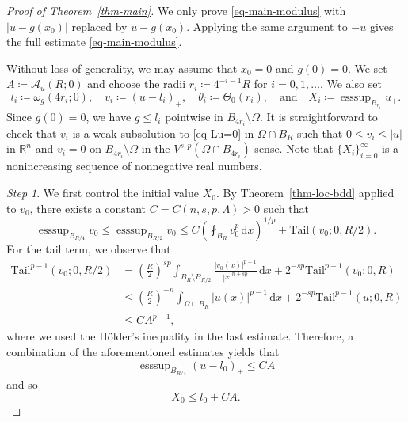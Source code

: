\documentclass[11pt]{amsart}
\theoremstyle{plain}
\theoremstyle{definition}
\numberwithin{equation}{section}
\DeclareMathOperator*{\esssup}{esssup}
\begin{document}
\begin{proof}[Proof of Theorem~\ref{thm-main}]
We only prove \eqref{eq-main-modulus} with $|u-g(x_0)|$ replaced by $u-g(x_0)$. Applying the same argument to $-u$ gives the full estimate \eqref{eq-main-modulus}.

Without loss of generality, we may assume that $x_0=0$ and $g(0)=0$. We set $A \coloneqq \mathcal A_u(R; 0)$ and choose the radii $r_i \coloneqq 4^{-i-1}R$ for $i=0, 1, \dots$. We also set
\begin{equation*}
        l_i\coloneqq \omega_g(4r_i; 0), \quad
        v_i\coloneqq (u-l_i)_+, \quad
        \theta_i\coloneqq \Theta_0(r_i), \quad \text{and} \quad
       X_i\coloneqq \esssup_{B_{r_i}}u_+. 
\end{equation*}
Since $g(0)=0$, we have $g \leq l_i$ pointwise in $B_{4r_i} \setminus \Omega$. It is straightforward to check that $v_i$ is a weak subsolution to \eqref{eq-Lu=0} in $\Omega \cap B_R$ such that $0 \leq v_i \leq |u|$ in $\mathbb{R}^n$ and $v_i=0$ on $B_{4r_i} \setminus \Omega$ in the $V^{s, p}(\Omega \cap B_{4r_i})$-sense. Note that $\{X_i\}_{i=0}^{\infty}$ is a nonincreasing sequence of nonnegative real numbers.

\emph{Step 1}. We first control the initial value $X_0$. By Theorem~\ref{thm-loc-bdd} applied to $v_0$, there exists a constant $C=C(n, s, p, \Lambda)>0$ such that
    \begin{equation*}
        \esssup_{B_{R/4}}v_0 \leq \esssup_{B_{R/2}}v_0 \leq C \left(\fint_{B_R}v_0^p \,\mathrm{d}x \right)^{1/p} + \mathrm{Tail}(v_0; 0, R/2).
    \end{equation*}
    For the tail term, we observe that
    \begin{align*}
            \mathrm{Tail}^{p-1}(v_0; 0, R/2)
            &=\left(\frac{R}{2}\right)^{sp} \int_{B_R \setminus B_{R/2}} \frac{|v_0(x)|^{p-1}}{|x|^{n+sp}}\,\mathrm{d}x + 2^{-sp}\mathrm{Tail}^{p-1}(v_0; 0, R)\\
            &\leq \left(\frac{R}{2}\right)^{-n} \int_{\Omega \cap B_R} |u(x)|^{p-1}\,\mathrm{d}x + 2^{-sp}\mathrm{Tail}^{p-1}(u; 0, R)\\
            &\leq CA^{p-1},
    \end{align*}
    where we used the H\"older's inequality in the last estimate. 
    Therefore, a combination of the aforementioned estimates yields that
    \begin{equation*}
        \esssup_{B_{R/4}}{(u-l_0)_+} \leq CA
    \end{equation*}
    and so
    \begin{equation*}
        X_0 \leq l_0+CA.
    \end{equation*}


\end{proof}
\end{document}
